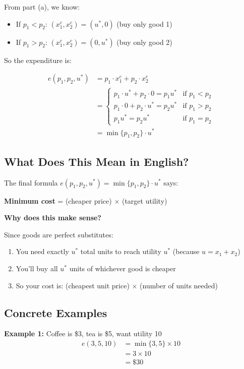 \documentclass[11pt]{article}
\begin{document}
From part (a), we know:
\begin{itemize}
\item If $p_1 < p_2$: $(x_1^c, x_2^c) = (u^*, 0)$ (buy only good 1)
\item If $p_1 > p_2$: $(x_1^c, x_2^c) = (0, u^*)$ (buy only good 2)
\end{itemize}

So the expenditure is:

\begin{align}
e(p_1, p_2, u^*) &= p_1 \cdot x_1^c + p_2 \cdot x_2^c \\
&= \begin{cases}
p_1 \cdot u^* + p_2 \cdot 0 = p_1 u^* & \text{if } p_1 < p_2 \\
p_1 \cdot 0 + p_2 \cdot u^* = p_2 u^* & \text{if } p_1 > p_2 \\
p_1 u^* = p_2 u^* & \text{if } p_1 = p_2
\end{cases} \\
&= \min\{p_1, p_2\} \cdot u^*
\end{align}

\subsection{What Does This Mean in English?}

The final formula $e(p_1, p_2, u^*) = \min\{p_1, p_2\} \cdot u^*$ says:

\begin{center}
\textbf{Minimum cost} = (cheaper price) $\times$ (target utility)
\end{center}

\textbf{Why does this make sense?}

Since goods are perfect substitutes:
\begin{enumerate}
\item You need exactly $u^*$ total units to reach utility $u^*$ (because $u = x_1 + x_2$)
\item You'll buy all $u^*$ units of whichever good is cheaper
\item So your cost is: (cheapest unit price) $\times$ (number of units needed)
\end{enumerate}

\subsection{Concrete Examples}

\textbf{Example 1:} Coffee is \$3, tea is \$5, want utility 10
\begin{align*}
e(3, 5, 10) &= \min\{3, 5\} \times 10 \\
&= 3 \times 10 \\
&= \$30
\end{align*}
\end{document}
